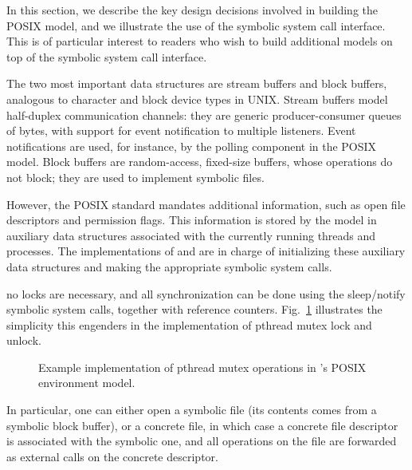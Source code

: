 In this section, we describe the key design decisions involved in building the \cnine POSIX model, and we illustrate the use of the symbolic system call interface.  This is of particular interest to readers who wish to build additional models on top of the \cnine symbolic system call interface.

  The two most important data structures are stream buffers and block buffers, analogous to character and block device types in UNIX.  Stream buffers model half-duplex communication channels: they are generic producer-consumer queues of bytes, with support for event notification to multiple listeners.  Event notifications are used, for instance, by the polling component in the POSIX model.  Block buffers are random-access, fixed-size buffers, whose operations do not block; they are used to implement symbolic files.

  However, the POSIX standard mandates additional information, such as open file descriptors and permission flags. This information is stored by the model in auxiliary data structures associated with the currently running threads and processes. The implementations of  and  are in charge of initializing these auxiliary data structures and making the appropriate symbolic system calls.

  no locks are necessary, and all synchronization can be done using the sleep/notify symbolic system calls, together with reference counters.  Fig.~\ref{fig:mutexcode} illustrates the simplicity this engenders in the implementation of pthread mutex lock and unlock.

\begin{figure}[h!]
  \centering
  \caption{Example implementation of pthread mutex operations in \cnine's POSIX environment model.}
  \label{fig:mutexcode}
\end{figure}

  In particular, one can either open a symbolic file (its contents comes from a symbolic block buffer), or a concrete file, in which case a concrete file descriptor is associated with the symbolic one, and all operations on the file are forwarded as external calls on the concrete descriptor. 

